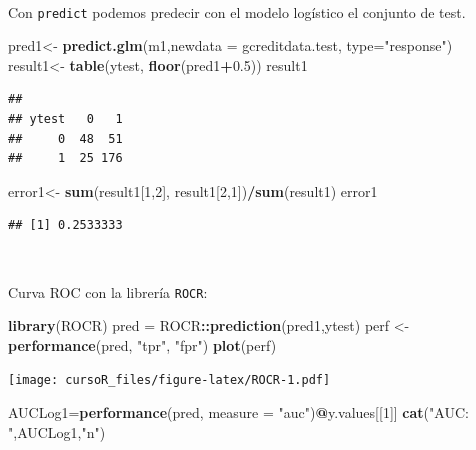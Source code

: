\documentclass[]{book}
\newenvironment{Shaded}{\begin{snugshade}}{\end{snugshade}}
\newcommand{\KeywordTok}[1]{\textcolor[rgb]{0.13,0.29,0.53}{\textbf{#1}}}
\newcommand{\DataTypeTok}[1]{\textcolor[rgb]{0.13,0.29,0.53}{#1}}
\newcommand{\DecValTok}[1]{\textcolor[rgb]{0.00,0.00,0.81}{#1}}
\newcommand{\FloatTok}[1]{\textcolor[rgb]{0.00,0.00,0.81}{#1}}
\newcommand{\StringTok}[1]{\textcolor[rgb]{0.31,0.60,0.02}{#1}}
\newcommand{\OperatorTok}[1]{\textcolor[rgb]{0.81,0.36,0.00}{\textbf{#1}}}
\newcommand{\NormalTok}[1]{#1}
\begin{document}
~

Con \texttt{predict} podemos predecir con el modelo logístico el
conjunto de test.

\begin{Shaded}
\begin{Highlighting}[]
\NormalTok{pred1<-}\StringTok{ }\KeywordTok{predict.glm}\NormalTok{(m1,}\DataTypeTok{newdata =}\NormalTok{ gcreditdata.test, }\DataTypeTok{type=}\StringTok{"response"}\NormalTok{)}
\NormalTok{result1<-}\StringTok{ }\KeywordTok{table}\NormalTok{(ytest, }\KeywordTok{floor}\NormalTok{(pred1}\OperatorTok{+}\FloatTok{0.5}\NormalTok{))}
\NormalTok{result1}
\end{Highlighting}
\end{Shaded}

\begin{verbatim}
##      
## ytest   0   1
##     0  48  51
##     1  25 176
\end{verbatim}

\begin{Shaded}
\begin{Highlighting}[]
\NormalTok{error1<-}\StringTok{ }\KeywordTok{sum}\NormalTok{(result1[}\DecValTok{1}\NormalTok{,}\DecValTok{2}\NormalTok{], result1[}\DecValTok{2}\NormalTok{,}\DecValTok{1}\NormalTok{])}\OperatorTok{/}\KeywordTok{sum}\NormalTok{(result1)}
\NormalTok{error1}
\end{Highlighting}
\end{Shaded}

\begin{verbatim}
## [1] 0.2533333
\end{verbatim}

~

Curva ROC con la librería \texttt{ROCR}:

\begin{Shaded}
\begin{Highlighting}[]
\KeywordTok{library}\NormalTok{(ROCR)}
\NormalTok{pred =}\StringTok{ }\NormalTok{ROCR}\OperatorTok{::}\KeywordTok{prediction}\NormalTok{(pred1,ytest)}
\NormalTok{perf <-}\StringTok{ }\KeywordTok{performance}\NormalTok{(pred, }\StringTok{"tpr"}\NormalTok{, }\StringTok{"fpr"}\NormalTok{)}
\KeywordTok{plot}\NormalTok{(perf)}
\end{Highlighting}
\end{Shaded}

\texttt{[image: cursoR\_files/figure-latex/ROCR-1.pdf]}

\begin{Shaded}
\begin{Highlighting}[]
\NormalTok{AUCLog1=}\KeywordTok{performance}\NormalTok{(pred, }\DataTypeTok{measure =} \StringTok{"auc"}\NormalTok{)}\OperatorTok{@}\NormalTok{y.values[[}\DecValTok{1}\NormalTok{]]}
\KeywordTok{cat}\NormalTok{(}\StringTok{"AUC: "}\NormalTok{,AUCLog1,}\StringTok{"n"}\NormalTok{)}
\end{Highlighting}
\end{Shaded}
\end{document}
